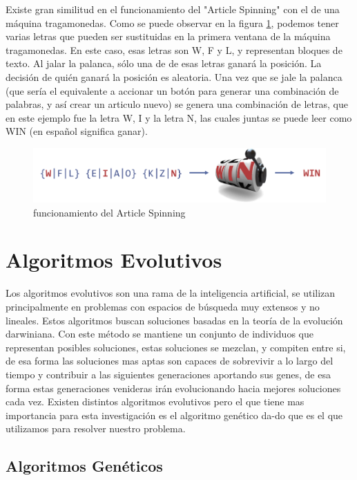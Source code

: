 Existe gran similitud en el funcionamiento del "Article Spinning" con el de una máquina tragamonedas. Como se puede observar en la figura \ref{as}, podemos tener varias letras que pueden ser sustituidas en la primera ventana de la máquina tragamonedas. En este caso, esas letras son W, F y L, y representan bloques de texto. Al jalar la palanca, sólo una de de esas letras ganará la posición. La decisión de quién ganará la posición es aleatoria. Una vez que se jale la palanca (que sería el equivalente a accionar un botón para generar una combinación de palabras, y así crear un articulo nuevo) se genera una combinación de letras, que en este ejemplo fue la letra W, I y la letra N, las cuales juntas se puede leer como WIN (en español significa ganar).


\begin{figure}[htp]
  \centerline{\includegraphics[width=4.5in]{as.png}} 
  \caption{funcionamiento del Article Spinning} 
\label{as}
\end{figure}

\clearpage
\section{Algoritmos Evolutivos}

Los algoritmos evolutivos son una rama de la inteligencia artificial, se utilizan principalmente en problemas con espacios de búsqueda muy extensos y no lineales. Estos algoritmos buscan soluciones basadas en la teoría de la evolución darwiniana. 
Con este método se mantiene un conjunto de individuos que representan posibles soluciones, estas soluciones se mezclan, y compiten entre si, de esa forma las soluciones mas aptas son capaces de sobrevivir a lo largo del tiempo y contribuir a las siguientes generaciones aportando sus genes, de esa forma estas generaciones venideras irán evolucionando hacia mejores soluciones cada vez. Existen distintos algoritmos evolutivos pero el que tiene mas importancia para esta investigación es el algoritmo genético da-do que es el que utilizamos para resolver nuestro problema.\cite{malcolm2008approach}

\clearpage
\subsection{Algoritmos Genéticos}

